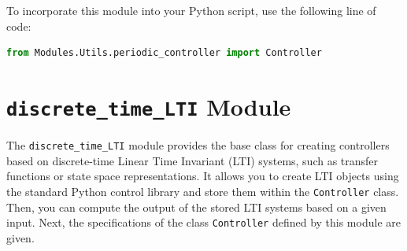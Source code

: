 \documentclass[12pt]{report}
\begin{document}
To incorporate this module into your Python script, use the following line of code:

\begin{lstlisting}[language = Python]
from Modules.Utils.periodic_controller import Controller
\end{lstlisting}

\section{\texttt{discrete\_time\_LTI} Module}

The \texttt{discrete\_time\_LTI} module provides the base class for creating controllers based on discrete-time Linear Time Invariant (LTI) systems, such as transfer functions or state space representations. It allows you to create LTI objects using the standard Python control library and store them within the \texttt{Controller} class. Then, you can compute the output of the stored LTI systems based on a given input. Next, the specifications of the class \texttt{Controller} defined by this module are given.
\end{document}
